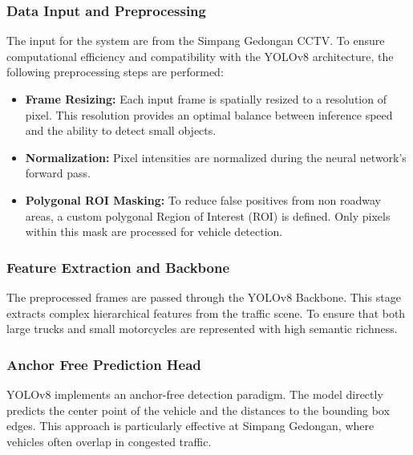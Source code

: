 \documentclass[conference]{IEEEtran}
\begin{document}
\subsubsection{Data Input and Preprocessing}
The input for the system are from the Simpang Gedongan CCTV. To ensure computational efficiency and compatibility with the YOLOv8 architecture, the following preprocessing steps are performed:
\begin{itemize}
    \item \textbf{Frame Resizing:} Each input frame is spatially resized to a resolution of pixel. This resolution provides an optimal balance between inference speed and the ability to detect small objects.
    \item \textbf{Normalization:} Pixel intensities are normalized during the neural network's forward pass.
    \item \textbf{Polygonal ROI Masking:} To reduce false positives from non roadway areas, a custom polygonal Region of Interest (ROI) is defined. Only pixels within this mask are processed for vehicle detection.
\end{itemize}

\subsubsection{Feature Extraction and Backbone}
The preprocessed frames are passed through the YOLOv8 Backbone. This stage extracts complex hierarchical features from the traffic scene. To ensure that both large trucks and small motorcycles are represented with high semantic richness.

\subsubsection{Anchor Free Prediction Head}
YOLOv8 implements an anchor-free detection paradigm. The model directly predicts the center point of the vehicle and the distances to the bounding box edges. This approach is particularly effective at Simpang Gedongan, where vehicles often overlap in congested traffic. 
\end{document}
